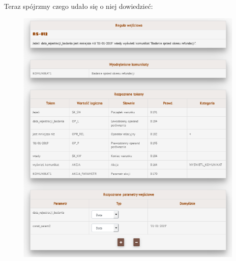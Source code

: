 \newpage
Teraz spójrzmy czego udało się o niej dowiedzieć:
\begin{figure}[H]
	\centering
	\includegraphics[scale=0.9]{img/app-eksperymenty/p1-2.png}
\end{figure}


